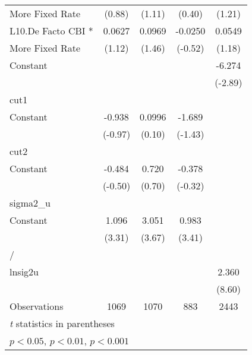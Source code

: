 {\begin{tabular}{l*{4}{c}}
More Fixed Rate     &      (0.88)         &      (1.11)         &      (0.40)         &      (1.21)         \\
[1em]
L10.De Facto CBI *  &      0.0627         &      0.0969         &     -0.0250         &      0.0549         \\
More Fixed Rate     &      (1.12)         &      (1.46)         &     (-0.52)         &      (1.18)         \\
[1em]
Constant            &                     &                     &                     &      -6.274\sym{**} \\
                    &                     &                     &                     &     (-2.89)         \\
\hline
cut1                &                     &                     &                     &                     \\
Constant            &      -0.938         &      0.0996         &      -1.689         &                     \\
                    &     (-0.97)         &      (0.10)         &     (-1.43)         &                     \\
\hline
cut2                &                     &                     &                     &                     \\
Constant            &      -0.484         &       0.720         &      -0.378         &                     \\
                    &     (-0.50)         &      (0.70)         &     (-0.32)         &                     \\
\hline
sigma2\_u            &                     &                     &                     &                     \\
Constant            &       1.096\sym{***}&       3.051\sym{***}&       0.983\sym{***}&                     \\
                    &      (3.31)         &      (3.67)         &      (3.41)         &                     \\
\hline
/                   &                     &                     &                     &                     \\
lnsig2u             &                     &                     &                     &       2.360\sym{***}\\
                    &                     &                     &                     &      (8.60)         \\
\hline
Observations        &        1069         &        1070         &         883         &        2443         \\
\hline\hline
\multicolumn{5}{l}{\footnotesize \textit{t} statistics in parentheses}\\
\multicolumn{5}{l}{\footnotesize \sym{*} \(p<0.05\), \sym{**} \(p<0.01\), \sym{***} \(p<0.001\)}\\
\end{tabular}
}
